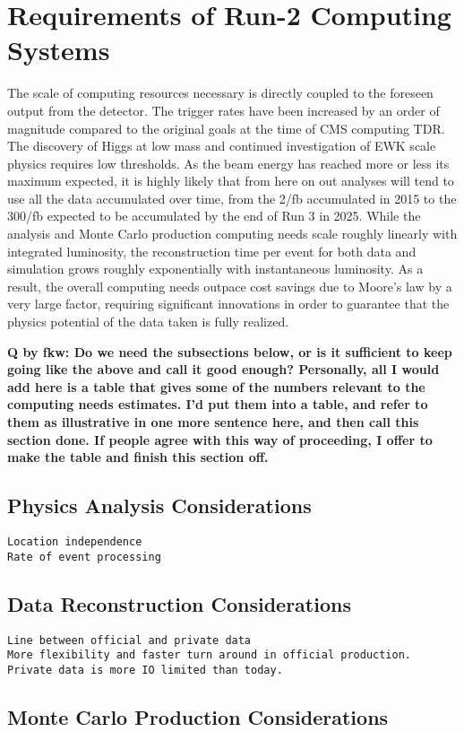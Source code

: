 \section{Requirements of Run-2 Computing Systems}

The scale of computing resources necessary is directly coupled to the foreseen output from the
detector.  The trigger rates have been increased by an order of magnitude compared to the
original goals at the time of CMS computing TDR. The discovery of Higgs at low mass and
continued investigation of EWK scale physics requires low thresholds. 
As the beam energy has reached more or less its maximum expected, it is highly likely that
from here on out analyses will tend to use all the data accumulated over time, from the 2/fb
accumulated in 2015 to the 300/fb expected to be accumulated by the end of Run 3 in 2025.
%
While the analysis and Monte Carlo production computing needs scale roughly linearly with integrated luminosity, the reconstruction
time per event for both data and simulation grows roughly exponentially with instantaneous luminosity.
As a result, the overall computing needs outpace cost savings due to Moore's law by a very large factor,
requiring significant innovations in order to guarantee that the physics potential of the data taken is fully realized.

{\bf Q by fkw: Do we need the subsections below, or is it sufficient to keep going like the above and call it good enough?
Personally, all I would add here is a table that gives some of the numbers relevant to the computing needs estimates.
I'd put them into a table, and refer to them as illustrative in one more sentence here, and then call this section done.
If people agree with this way of proceeding, I offer to make the table and finish this section off.}


\subsection{Physics Analysis Considerations}
\begin{verbatim}
Location independence
Rate of event processing
\end{verbatim}
\subsection{Data Reconstruction Considerations}
\begin{verbatim}
Line between official and private data
More flexibility and faster turn around in official production.  
Private data is more IO limited than today.
\end{verbatim}
\subsection{Monte Carlo Production Considerations}
